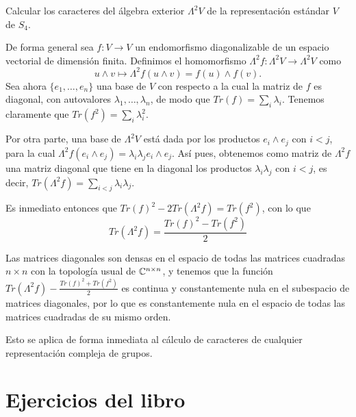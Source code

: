 \documentclass[twoside]{article}
\begin{document}
\newpage
\begin{ejercicio}{}
Calcular los caracteres del álgebra exterior $\Lambda^2 V$ de la representación estándar $V$ de $S_4$.
\end{ejercicio}
\begin{solucion}
De forma general sea $f:V\to V$ un endomorfismo diagonalizable de un espacio vectorial de dimensión finita. Definimos el homomorfismo $\Lambda^2 f:\Lambda^2V\to \Lambda^2 V$ como $$u\land v\mapsto \Lambda^2f(u\land v)=f(u)\land f(v).$$ Sea ahora $\{e_1,\dots, e_n\}$ una base de $V$ con respecto a la cual la matriz de $f$ es diagonal, con autovalores $\lambda_1,\dots, \lambda_n$, de modo que $Tr(f)=\sum_i\lambda_i$. Tenemos claramente que $Tr(f^2)=\sum_i\lambda_i^2$. 

Por otra parte, una base de $\Lambda^2V$ está dada por los productos $e_i\land e_j$ con $i<j$, para la cual $\Lambda^2 f(e_i\land e_j)=\lambda_i\lambda_j e_i\land e_j$. Así pues, obtenemos como matriz de $\Lambda^2 f$ una matriz diagonal que tiene en la diagonal los productos $\lambda_i\lambda_j$ con $i<j$, es decir, $Tr(\Lambda^2 f)=\sum_{i<j}\lambda_i\lambda_j$. 

Es inmediato entonces que $Tr(f)^2-2Tr(\Lambda^2 f)=Tr(f^2)$, con lo que 
\[
Tr(\Lambda^2 f)=\frac{Tr(f)^2-Tr(f^2)}{2}
\]

Las matrices diagonales son densas en el espacio de todas las matrices cuadradas $n\times n$ con la topología usual de $\mathbb{C}^{n\times n}$, y tenemos que la función $Tr(\Lambda^2 f)-\frac{Tr(f)^2+Tr(f^2)}{2}$ es continua y constantemente nula en el subespacio de matrices diagonales, por lo que es constantemente nula en el espacio de todas las matrices cuadradas de su mismo orden. 

Esto se aplica de forma inmediata al cálculo de caracteres de cualquier representación compleja de grupos. 
\end{solucion}
\newpage 
\section{Ejercicios del libro}
\end{document}

